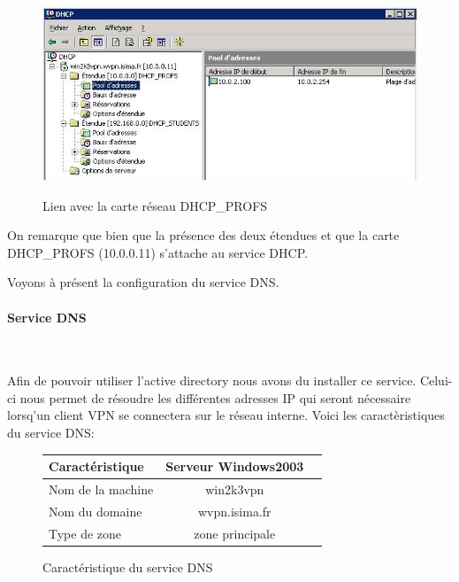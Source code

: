\begin{figure}[H]
	\begin{center}
	\includegraphics[width=\textwidth]{partie_2/screen_windows/dhcp.JPG}\\
	\end{center}
	\caption{Lien avec la carte réseau DHCP\_PROFS}
	\label{Screen_client_dhcp}
\end{figure}


On remarque que bien que la présence des deux étendues et que la carte DHCP\_PROFS (10.0.0.11) s'attache au service DHCP.
~\


Voyons à présent la configuration du service DNS.

\paragraph{Service DNS}
~\


Afin de pouvoir utiliser l'active directory nous avons du installer ce service. Celui-ci nous permet de résoudre les différentes adresses IP qui seront nécessaire lorsq'un client VPN se connectera sur le réseau interne.
Voici les caractèristiques du service DNS:
~\


\begin{figure}[H]
	\begin{center}
\begin{tabular}{|l|c|c|}
\hline
Caractéristique & Serveur Windows2003 \\
\hline
Nom de la machine &  win2k3vpn\\
Nom du domaine & wvpn.isima.fr\\
Type de zone &  zone principale\\
\hline
\end{tabular}
	\end{center}
	\caption{Caractéristique du service DNS}
	\label{service_DNS}
\end{figure}

